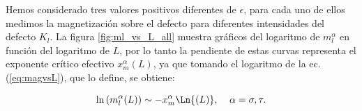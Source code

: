 Hemos considerado tres valores positivos diferentes de $\epsilon$, para cada uno de ellos medimos la magnetizaci\'on sobre el
 defecto para diferentes intensidades del defecto $K_{l}$. La figura \ref{fig:ml_vs_L_all}
 muestra gr\'aficos del logaritmo de $m_{l}^{\alpha}$ en funci\'on del logaritmo de $L$, por lo tanto la pendiente de estas curvas
 representa el exponente crítico efectivo $x_{m}^{\alpha}(L)$, ya que tomando el logaritmo de la ec.(\ref{eq:magvsL}), que lo define, se obtiene:
 
\begin{equation}
	\label{eq:logmagvsL}
	\ln{(m_{l}^{\alpha}(L))} \sim -x_{m}^{\alpha}\Ln{(L)}, \; \; \; \; \alpha=\sigma , \tau .
\end{equation}
 
